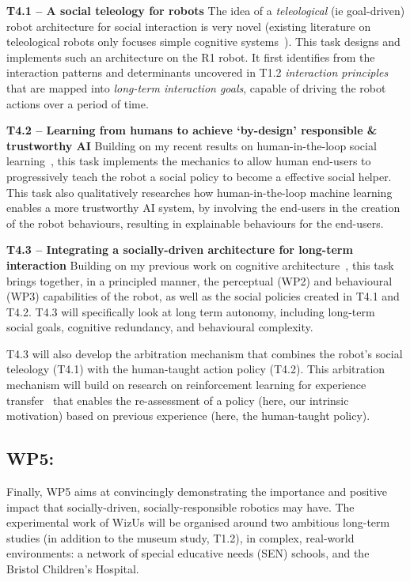 \documentclass[11pt,a4paper]{report}
\newcommand{\project}{WizUs\xspace}
\begin{document}
\textbf{T4.1 -- A social teleology for robots}
The idea of a \emph{teleological} (ie goal-driven) robot architecture for social
interaction is very novel (existing literature on teleological robots only focuses
simple cognitive systems~\cite{oudeyer2005playground,forestier2017unified}). This task designs and implements such an
architecture on the R1 robot. It first identifies from the interaction patterns and
determinants uncovered in T1.2 \emph{interaction principles} that are mapped
into \emph{long-term interaction goals}, capable of driving the robot actions
over a period of time.

\textbf{T4.2 -- Learning from humans to achieve `by-design' responsible \&
trustworthy AI} Building on my recent results on human-in-the-loop
social learning~\cite{senft2017supervised,senft2019teaching,winkle2020couch}, this task
implements the mechanics to allow human end-users to progressively
teach the robot a social policy to become a effective social helper.
This task also qualitatively researches how human-in-the-loop machine learning enables a more
trustworthy AI system, by involving the end-users in the creation of the robot
behaviours, resulting in explainable behaviours for the end-users.

\textbf{T4.3 -- Integrating a socially-driven architecture for long-term
interaction} Building on my previous work on cognitive
architecture~\cite{lemaignan2017artificial}, this task brings together, in a
principled manner, the perceptual (WP2) and behavioural
(WP3) capabilities of the robot, as well as the social policies created in T4.1 and
T4.2. T4.3 will specifically look at long term autonomy, including long-term
social goals, cognitive redundancy, and behavioural complexity.

T4.3 will also develop the arbitration mechanism that combines the robot's
social teleology (T4.1) with the human-taught action policy (T4.2). This
arbitration mechanism will build on research on reinforcement learning for
experience transfer~\cite{madden2004transfer} that enables the re-assessment of
a policy (here, our intrinsic motivation) based on previous experience (here,
the human-taught policy).

\subsection{WP5: \textbf{\wpFive}}

Finally, WP5 aims at convincingly demonstrating the importance and positive impact that
socially-driven, socially-responsible robotics may have. The experimental work
of \project will be organised around two ambitious long-term studies (in
addition to the museum study, T1.2), in complex, real-world environments: a
network of special educative needs (SEN) schools, and the Bristol Children's Hospital.
\end{document}
